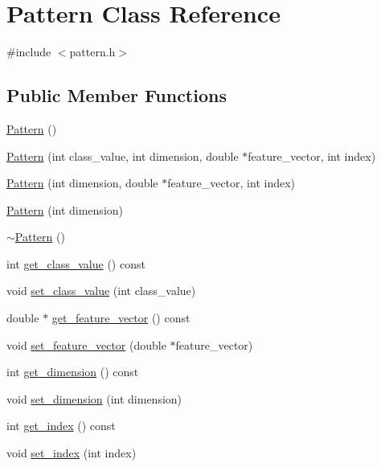 \hypertarget{classPattern}{\section{Pattern Class Reference}
\label{classPattern}
}


{\ttfamily \#include $<$pattern.\+h$>$}

\subsection*{Public Member Functions}
\begin{DoxyCompactItemize}
\item 
\hyperlink{classPattern_a95f42b0f1717d9e6c2d831e87d27f83c}{Pattern} ()
\item 
\hyperlink{classPattern_afd30bd038358f0eb824b3fc8786e2f2e}{Pattern} (int class\+\_\+value, int dimension, double $\ast$feature\+\_\+vector, int index)
\item 
\hyperlink{classPattern_ac17b02dbd849a7e1498c55cb67786fee}{Pattern} (int dimension, double $\ast$feature\+\_\+vector, int index)
\item 
\hyperlink{classPattern_a3a1bf7ddd196fac02018c9cde4c421cf}{Pattern} (int dimension)
\item 
\hyperlink{classPattern_a6e8b9388bbd39934e9f9534b974d7498}{$\sim$\+Pattern} ()
\item 
int \hyperlink{classPattern_aae331219e63c782b23f203ebad3aa7bc}{get\+\_\+class\+\_\+value} () const 
\item 
void \hyperlink{classPattern_ac4235d677a656d5cc272d192af210d4f}{set\+\_\+class\+\_\+value} (int class\+\_\+value)
\item 
double $\ast$ \hyperlink{classPattern_a32c93378e9aea3088de27263f1d50108}{get\+\_\+feature\+\_\+vector} () const 
\item 
void \hyperlink{classPattern_a0612d5b48232fa0a7697584263fc6287}{set\+\_\+feature\+\_\+vector} (double $\ast$feature\+\_\+vector)
\item 
int \hyperlink{classPattern_a3301651f9617962a7dd15575d381d8de}{get\+\_\+dimension} () const 
\item 
void \hyperlink{classPattern_aa498151def7e9e9fabf874bfead90b3b}{set\+\_\+dimension} (int dimension)
\item 
int \hyperlink{classPattern_a96c0f3b51801a27d0f8b06031b508b42}{get\+\_\+index} () const 
\item 
void \hyperlink{classPattern_ad74cb513a6a76c20121297f2ab867a07}{set\+\_\+index} (int index)
\end{DoxyCompactItemize}
